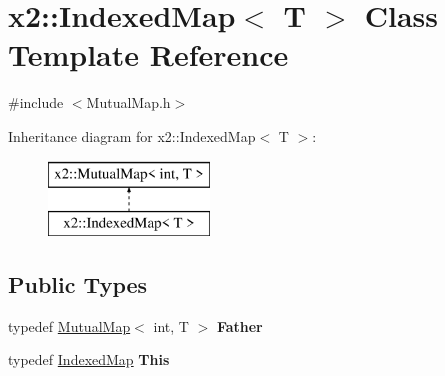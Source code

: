 \hypertarget{classx2_1_1_indexed_map}{}\section{x2\+:\+:Indexed\+Map$<$ T $>$ Class Template Reference}
\label{classx2_1_1_indexed_map}


{\ttfamily \#include $<$Mutual\+Map.\+h$>$}

Inheritance diagram for x2\+:\+:Indexed\+Map$<$ T $>$\+:\begin{figure}[H]
\begin{center}
\leavevmode
\includegraphics[height=2.000000cm]{classx2_1_1_indexed_map}
\end{center}
\end{figure}
\subsection*{Public Types}
\begin{DoxyCompactItemize}
\item 
\mbox{\label{classx2_1_1_indexed_map_ac4647adcaec364cbcd569a83faabccfe}} 
typedef \hyperlink{classx2_1_1_mutual_map}{Mutual\+Map}$<$ int, T $>$ {\bfseries Father}
\item 
\mbox{\label{classx2_1_1_indexed_map_a9541095b80539c1deb7248b59a8adbdf}} 
typedef \hyperlink{classx2_1_1_indexed_map}{Indexed\+Map} {\bfseries This}
\end{DoxyCompactItemize}
